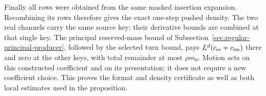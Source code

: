 Finally all rows were obtained from the same masked insertion expansion.
Recombining its rows therefore gives the exact one-step pushed density.
The two real channels carry the same source key; their derivative bounds
are combined at that single key. The principal reserved-mass bound of
Subsection~\ref{sec:regular-principal-producer}, followed by the selected
turn bound, pays $L^d(c_{\rm re}+c_{\rm im})$ there and zero at the other
keys, with total remainder at most $\rho m_0$. Motion acts on this
constructed coefficient and on its presentation; it does not require a
new coefficient choice. This proves the format and density certificate
as well as both local estimates used in the proposition.
